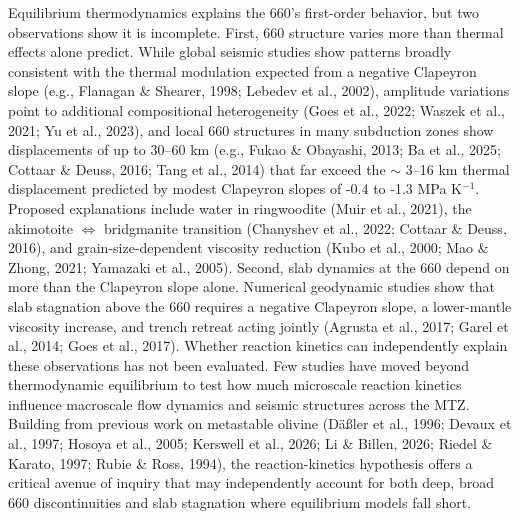 \documentclass[draft,linenumbers]{agujournal2019}
\begin{document}
Equilibrium thermodynamics explains the 660's first-order behavior, but
two observations show it is incomplete. First, 660 structure varies more
than thermal effects alone predict. While global seismic studies show
patterns broadly consistent with the thermal modulation expected from a
negative Clapeyron slope (e.g., Flanagan \& Shearer, 1998; Lebedev et
al., 2002), amplitude variations point to additional compositional
heterogeneity ({Goes et al.}, 2022; Waszek et al., 2021; {Yu et al.},
2023), and local 660 structures in many subduction zones show
displacements of up to 30--60 km (e.g., Fukao \& Obayashi, 2013; Ba et
al., 2025; Cottaar \& Deuss, 2016; Tang et al., 2014) that far exceed
the \(\sim\) 3--16 km thermal displacement predicted by modest Clapeyron
slopes of -0.4 to -1.3 MPa K\(^{-1}\). Proposed explanations include
water in ringwoodite (Muir et al., 2021), the akimotoite
\(\Leftrightarrow\) bridgmanite transition ({Chanyshev et al.}, 2022;
Cottaar \& Deuss, 2016), and grain-size-dependent viscosity reduction
(Kubo et al., 2000; Mao \& Zhong, 2021; Yamazaki et al., 2005). Second,
slab dynamics at the 660 depend on more than the Clapeyron slope alone.
Numerical geodynamic studies show that slab stagnation above the 660
requires a negative Clapeyron slope, a lower-mantle viscosity increase,
and trench retreat acting jointly ({Agrusta et al.}, 2017; Garel et al.,
2014; {Goes et al.}, 2017). Whether reaction kinetics can independently
explain these observations has not been evaluated. Few studies have
moved beyond thermodynamic equilibrium to test how much microscale
reaction kinetics influence macroscale flow dynamics and seismic
structures across the MTZ. Building from previous work on metastable
olivine (Däßler et al., 1996; Devaux et al., 1997; Hosoya et al., 2005;
Kerswell et al., 2026; Li \& Billen, 2026; Riedel \& Karato, 1997; Rubie
\& Ross, 1994), the reaction-kinetics hypothesis offers a critical
avenue of inquiry that may independently account for both deep, broad
660 discontinuities and slab stagnation where equilibrium models fall
short.
\end{document}
